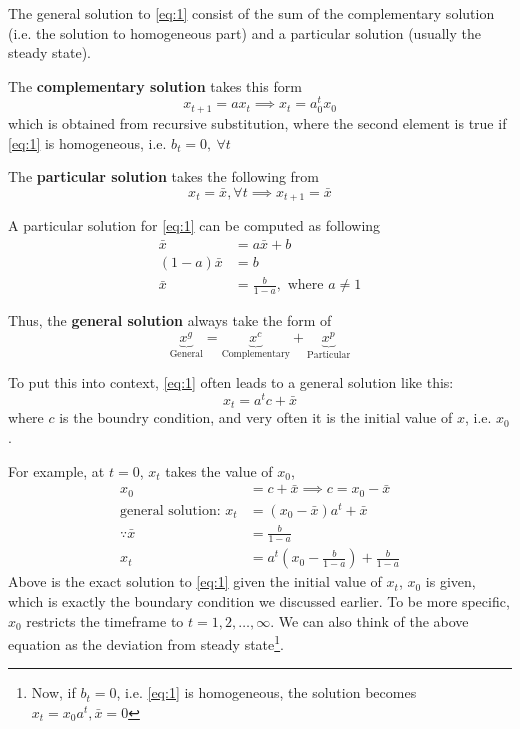\documentclass[twocolumn, fleqn]{article}
\begin{document}
	The general solution to \eqref{eq:1} consist of the sum of the complementary solution (i.e. the solution to
	homogeneous part) and a particular solution (usually the steady state).

	The \textbf{complementary solution} takes this form
	\begin{equation*}
		x_{t+1} = a x_t \implies x_t = a_0^t x_0
	\end{equation*}
	which is obtained from recursive substitution, where the second element is true if \eqref{eq:1} is homogeneous,
	i.e. $b_t =0, \ \forall t$

	The \textbf{particular solution} takes the following from
	\begin{equation*}
		x_t = \bar{x}, \forall t \implies x_{t+1}=\bar{x}
	\end{equation*}

	A particular solution for \eqref{eq:1} can be computed as following
	\begin{align*}
		\bar{x} &= a \bar{x} +b \\
		(1-a)\bar{x} &= b\\
		\bar{x} &= \frac{b}{1-a}, \text{ where } a \neq 1
	\end{align*}

	Thus, the \textbf{general solution} always take the form of
	\begin{equation}
		\underbrace{x^g}_{\text{General}} = \underbrace{x^c}_{\text{Complementary}} + \underbrace{x^p}_{
			\text{Particular}}\label{eq:1.2}
	\end{equation}

	To put this into context, \eqref{eq:1} often leads to a general solution like this:
	\begin{equation*}
		x_t = a^t c +\bar{x}
	\end{equation*}
	where $c$ is the boundry condition, and very often it is the initial value of $x$, i.e. $x_0$.

	For example, at $t =0$, $x_t$ takes the value of $x_0$,
	\begin{align*}
		x_0 &= c + \bar{x} \implies c = x_0 - \bar{x}\\
		\text{general solution: } x_t &= (x_0 - \bar{x})a^t + \bar{x}\\
		\because \bar{x} &= \frac{b}{1-a}\\
		x_t &= a^t(x_0 - \frac{b}{1-a}) + \frac{b}{1-a}
	\end{align*}
	Above is the exact solution to \eqref{eq:1} given the initial value of $x_t$, $x_0$ is given, which is exactly
	the boundary condition we discussed earlier.
	To be more specific, $x_0$ restricts the timeframe to
	$t = 1, 2, \dots, \infty$.
	We can also think of the above equation as the deviation from steady state\footnote{Now, if $b_t =0$, i.e. \eqref{eq:1} is homogeneous, the solution becomes $x_{t} = x_0 a^t, \bar{x}=0$}.
\end{document}
